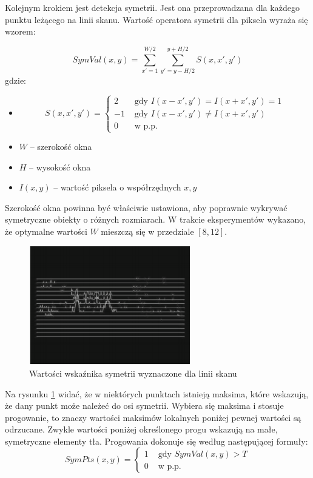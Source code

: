 Kolejnym krokiem jest detekcja symetrii. Jest ona przeprowadzana dla każdego punktu leżącego na linii skanu. Wartość operatora symetrii dla piksela wyraża się wzorem:

\begin{equation}
SymVal(x,y)=\sum_{x'=1}^{W/2}\sum_{y'=y-H/2}^{y+H/2}S(x, x', y')
\end{equation}
gdzie:
\begin{itemize}
\item
\begin{equation}
S(x,x',y')=\begin{cases}
2 & \text{ gdy } I(x-x',y')=I(x+x',y')=1 \\ 
-1 & \text{ gdy } I(x-x',y')\neq I(x+x',y') \\ 
0 & \text{ w p.p. }
\end{cases}
\end{equation}
\item $W$ -- szerokość okna
\item $H$ -- wysokość okna
\item $I(x,y)$ -- wartość piksela o współrzędnych $x,y$
\end{itemize}

Szerokość okna powinna być właściwie ustawiona, aby poprawnie wykrywać symetryczne obiekty o różnych rozmiarach. W trakcie eksperymentów wykazano, że optymalne wartości $W$ mieszczą się w przedziale $[8,12]$.

\begin{figure}
  \centering
  \includegraphics[width=7cm]{img/tl_peaks.png}
  \caption{Wartości wskaźnika symetrii wyznaczone dla linii skanu\cite{T1}}
  \label{fig:car_scan_lines}
\end{figure}

Na rysunku \ref{fig:car_scan_lines} widać, że w niektórych punktach istnieją maksima, które wskazują, że dany punkt może należeć do osi symetrii. Wybiera się maksima i stosuje progowanie, to znaczy wartości maksimów lokalnych poniżej pewnej wartości są odrzucane. Zwykle wartości poniżej określonego progu wskazują na małe, symetryczne elementy tła. Progowania dokonuje się według następującej formuły:
\begin{equation}
SymPts(x,y)=\begin{cases}
1 & \text{ gdy } SymVal(x,y)>T\\ 
0 & \text{ w p.p.}
\end{cases}
\end{equation}

